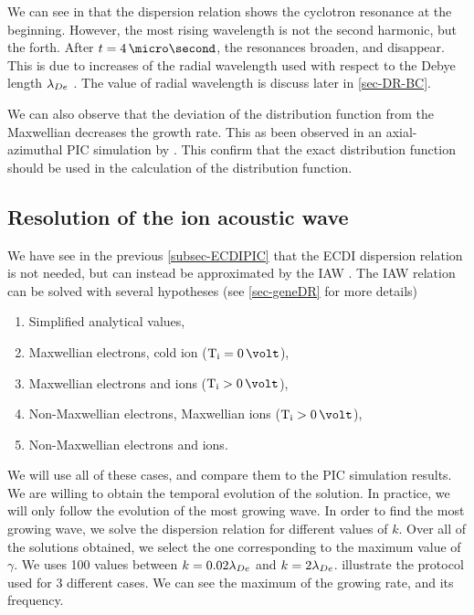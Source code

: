     We can see in  that the dispersion relation shows the cyclotron resonance at the beginning.
    However, the most rising wavelength is not the second harmonic, but the forth.
    After $t=4\,\micro\second$, the resonances broaden, and disappear.
    This is due to increases of the radial wavelength used with respect to the Debye length $\lambda_{De}$ \citep{lafleur2016a,ducrocq2006,cavalier2013}.
    The value of radial wavelength is discuss later in \cref{sec-DR-BC}.
    
    We can also observe that the deviation of the distribution function from the Maxwellian decreases the growth rate.
    This as been observed  in an axial-azimuthal \ac{PIC} simulation by \citet{lafleur2018}.
    This confirm that the exact distribution function should be used in the calculation of the distribution function.
    
  \subsection{Resolution of the ion acoustic wave} \label{subsec-VDFIAW}
  
  We have see in the previous \cref{subsec-ECDIPIC} that the \ac{ECDI} dispersion relation is not needed, but can instead be approximated by the \ac{IAW} \citep{lafleur2018,janhunen2018,taccogna2019}.
  The \ac{IAW} relation can be solved with several hypotheses (see \cref{sec-geneDR} for more details)
  \begin{enumerate}
    \item Simplified analytical values,
    \item Maxwellian electrons, cold ion ($\Ti = 0\,\volt$),
    \item Maxwellian electrons and ions ($\Ti > 0\,\volt$),
    \item Non-Maxwellian electrons, Maxwellian ions ($\Ti > 0\,\volt$),
    \item Non-Maxwellian electrons and ions.
  \end{enumerate}
  
  We will use all of these cases, and compare them to the \ac{PIC} simulation results.
  We are willing to obtain the temporal evolution of the solution.
  In practice, we will only follow the evolution of the most growing wave.
  In order to find the most growing wave, we solve the dispersion relation for different values of $k$.
  Over all of the solutions obtained, we select the one corresponding to the maximum value of $\gamma$.
  We uses 100 values between $k=0.02 \lambda_{De}$ and $k = 2 \lambda_{De}$.
   illustrate the protocol used for 3 different cases.
  We can see the maximum of the growing rate, and its frequency.
  
